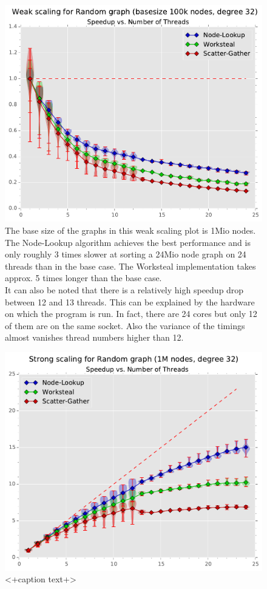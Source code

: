 \begin{figure}[ht]
	\centering
	\includegraphics[width=\columnwidth]{plots/weakscaling_gtRANDOMLIN32_n1000000_deg32.pdf}
	\caption{The base size of the graphs in this weak scaling plot is 1Mio nodes.
		The Node-Lookup algorithm achieves the best performance and is only roughly 3 times slower at sorting a 24Mio node graph on 24 threads than in the base case. The Worksteal implementation takes approx. 5 times longer than the base case. \\
	It can also be noted that there is a relatively high speedup drop between 12 and 13 threads.
	This can be explained by the hardware on which the program is run. In fact, there are 24 cores but only 12 of them are on the same socket.
	Also the variance of the timings almost vanishes thread numbers higher than 12.
}
	\label{fig:weakscaling}
\end{figure}

\begin{figure}[ht]
	\centering
	\includegraphics[width=\columnwidth]{plots/strongscaling_gtRANDOMLIN_n1000000_deg32.pdf}
	\caption{<+caption text+>}
	\label{fig:strongscaling}
\end{figure}




